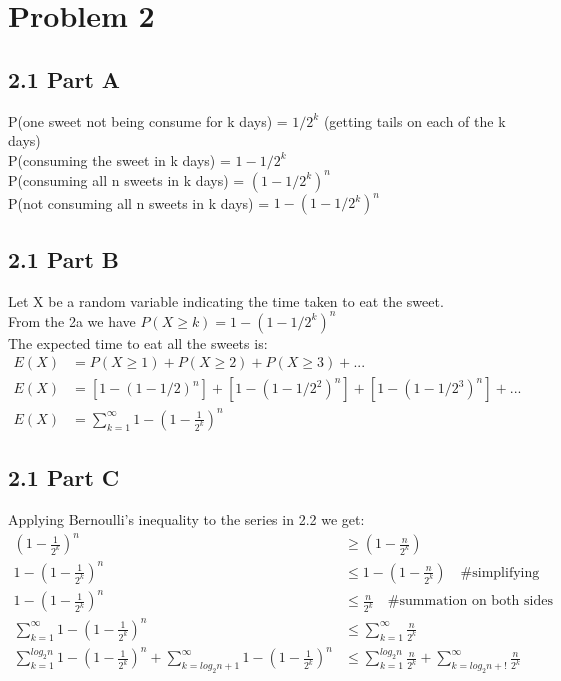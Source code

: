 \documentclass[12pt]{article}
\begin{document}
\section*{Problem 2}

\subsection*{2.1 Part A}
P(one sweet not being consume for k days) = \(1/2^k\) (getting tails on each of the k days) \\
P(consuming the sweet in k days) = \(1 -1/2^k\) \\
P(consuming all n sweets in k days) = \((1 -1/2^k)^n\) \\
P(not consuming all n sweets in k days) = \(1-(1 -1/2^k)^n\)

\subsection*{2.1 Part B}
Let X be a random variable indicating the time taken to eat the sweet. \\
From the 2a we have \(P(X\ge k) = 1-(1 -1/2^k)^n\) \\
The expected time to eat all the sweets is: \\
\begin{equation}
\begin{aligned}
\nonumber
E(X)&=P(X\ge 1)+P(X\ge 2)+P(X\ge 3)+... \\
E(X)&=[1-(1-1/2)^n] + [1-(1 -1/2^2)^n] + [1-(1 -1/2^3)^n] + ... \\
E(X)&=\sum_{k=1}^{\infty} 1 - (1-\frac{1}{2^k})^n
\end{aligned}
\end{equation}


\subsection*{2.1 Part C}

Applying Bernoulli's inequality to the series in 2.2 we get: 
\begin{equation}
\begin{aligned}
\nonumber
(1-\frac{1}{2^k})^n &\ge (1-\frac{n}{2^k}) \\
1-(1-\frac{1}{2^k})^n &\leq 1-(1-\frac{n}{2^k}) \quad \text{\# simplifying} \\
1-(1-\frac{1}{2^k})^n &\leq \frac{n}{2^k} \quad \text{\# summation on both sides}\\
\sum_{k=1}^{\infty} 1-(1-\frac{1}{2^k})^n &\leq \sum_{k=1}^{\infty} \frac{n}{2^k} \\
\sum_{k=1}^{log_{2}n} 1-(1-\frac{1}{2^k})^n + \sum_{k=log_{2}n+1}^{\infty} 1-(1-\frac{1}{2^k})^n &\leq \sum_{k=1}^{log_2n} \frac{n}{2^k} + \sum_{k=log_2n+!}^{\infty} \frac{n}{2^k} \\
\end{aligned}
\end{equation}
\end{document}
